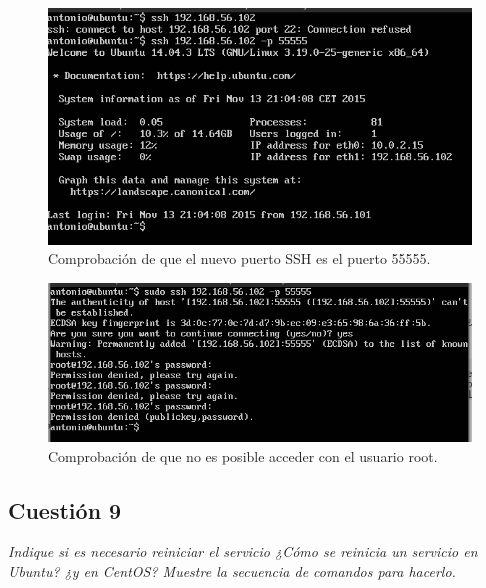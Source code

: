 \begin{figure}[H]
    \begin{center}
        \includegraphics[scale=0.6]{imagenes/img6}
        \caption{Comprobación de que el nuevo puerto SSH es el puerto 55555.}
        \label{fig7}
    \end{center}
\end{figure}

\begin{figure}[H]
    \begin{center}
        \includegraphics[scale=0.6]{imagenes/img8}
        \caption{Comprobación de que no es posible acceder con el usuario root.}
        \label{fig8}
    \end{center}
\end{figure}






\subsection{Cuestión 9}
\textit{Indique si es necesario reiniciar el servicio ¿Cómo se reinicia un servicio en Ubuntu? ¿y en CentOS? Muestre la secuencia de comandos para hacerlo.}
\newline

